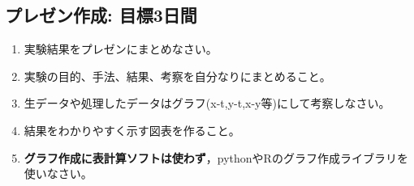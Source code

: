 \documentclass{jsarticle}
\begin{document}

\subsection{プレゼン作成: 目標3日間}
\begin{enumerate}
\item 実験結果をプレゼンにまとめなさい。
\item 実験の目的、手法、結果、考察を自分なりにまとめること。
\item 生データや処理したデータはグラフ(x-t,y-t,x-y等)にして考察しなさい。
\item 結果をわかりやすく示す図表を作ること。
\item \textbf{グラフ作成に表計算ソフトは使わず}，pythonやRのグラフ作成ライブラリを使いなさい。
\end{enumerate}

\end{document}
